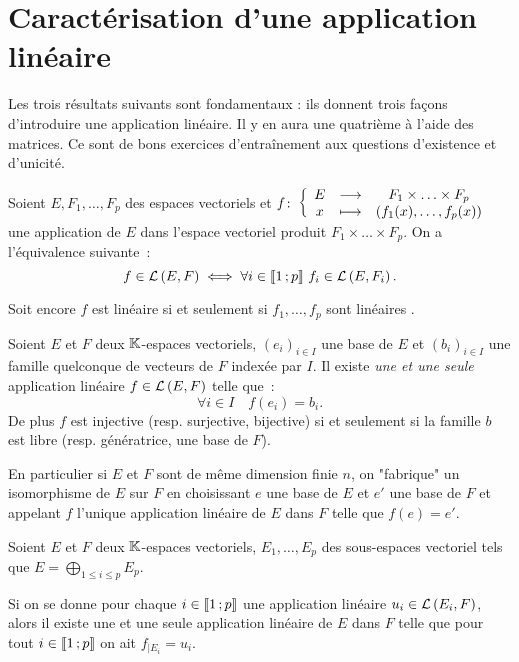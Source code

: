 \section{Caractérisation d'une application linéaire}
\label{sec-chap0:CaracLin}
Les trois résultats suivants sont fondamentaux : ils donnent trois façons d'introduire une application linéaire. Il y en aura une quatrième à l'aide des matrices. Ce sont de bons exercices d'entraînement aux questions d'existence et d'unicité.
\begin{theo}
	Soient $E, F_1, \ldots, F_p$ des espaces vectoriels et $f\colon \left\{\begin{array}{ccc} E & \longrightarrow &F_1 \times \ldots \times F_p\\ x & \longmapsto & (f_1(x), \ldots, f_p(x)) \end{array} \right.$ une application de $E$ dans l'espace vectoriel produit $F_1 \times \ldots \times F_p$. On a l'équivalence suivante~:
	\begin{equation}
		f \in \mathcal{L}\left(E,F\right) \iff \forall i \in \mathopen{\llbracket}1\mathclose{}\mathpunct{};p\mathclose{\rrbracket} \ f_i \in \mathcal{L}\left(E,F_i\right).
	\end{equation}
\end{theo}
Soit encore $f$ est linéaire  si et seulement si $f_1, \ldots, f_p$ sont linéaires .
\begin{theo}
	Soient $E$ et $F$ deux $\mathbb{K}$-espaces vectoriels, $(e_i)_{i \in I}$ une base de $E$ et $(b_i)_{i \in I}$ une famille quelconque de vecteurs de $F$ indexée par $I$. Il existe \emph{une et une seule} application linéaire $f \in \mathcal{L}\left(E,F\right)$ telle que~:
	\begin{equation}
		\forall i \in I \quad f(e_i)=b_i.
	\end{equation}
	De plus $f$ est injective (resp. surjective, bijective) si et seulement si la famille $b$ est libre  (resp. génératrice, une base de $F$).
\end{theo}
En particulier si $E$ et $F$ sont de même dimension finie $n$, on "fabrique" un isomorphisme de $E$ sur $F$ en choisissant $e$ une base de $E$ et $e'$ une base de $F$ et appelant $f$ l'unique application linéaire de $E$ dans $F$ telle que $f(e)=e'$.

\begin{theo}
	Soient $E$ et $F$ deux $\mathbb{K}$-espaces vectoriels, $E_1, \ldots, E_p$ des sous-espaces vectoriel tels que $E= \bigoplus_{1 \leq i \leq p} E_p$.
	
	Si on se donne pour chaque $i \in \mathopen{\llbracket}1\mathclose{}\mathpunct{};p\mathclose{\rrbracket}$ une application linéaire $u_i \in \mathcal{L}\left(E_i,F\right)$, alors il existe une et une seule application linéaire de $E$ dans $F$ telle que pour tout $i \in \mathopen{\llbracket}1\mathclose{}\mathpunct{};p\mathclose{\rrbracket}$ on ait $f_{|E_i} = u_i$.
\end{theo}
